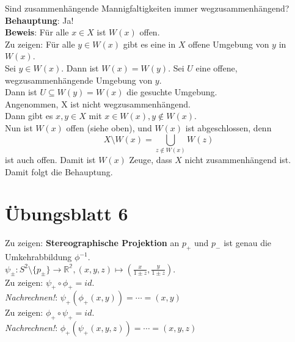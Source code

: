 \begin{problem}[4b]
  Sind zusammenhängende Mannigfaltigkeiten immer wegzusammenhängend? \\
  \textbf{Behauptung}: Ja! \\
  \textbf{Beweis}: Für alle \( x \in X \) ist \( W(x) \) offen. \\
  Zu zeigen: Für alle \( y \in W(x) \) gibt es eine in \( X \) offene Umgebung von \( y \) in \( W(x) \). \\
  Sei \( y \in W(x) \). Dann ist \( W(x) = W(y) \). Sei \( U \) eine offene, wegzusammenhängende Umgebung von \( y \). \\
  Dann ist \( U \subseteq W(y) = W(x) \) die gesuchte Umgebung. \\
  Angenommen, X ist nicht wegzusammenhängend. \\
  Dann gibt es \( x,y \in X \) mit \( x \in W(x), y \notin W(x) \). \\
  Nun ist \( W(x) \) offen (siehe oben), und \( W(x) \) ist abgeschlossen, denn
  \begin{equation*}
    X \setminus W(x) = \bigcup_{z \notin W(x)} W(z)
  \end{equation*}
  ist auch offen. Damit ist \( W(x) \) Zeuge, dass \( X \) nicht zusammenhängend ist. Damit folgt die Behauptung.
\end{problem}



%
\section{Übungsblatt 6}

\begin{problem}[1a]
  Zu zeigen: \textbf{Stereographische Projektion} an \( p_+ \) und \( p_- \) ist genau die Umkehrabbildung \( \phi^{-1} \). \\
  \( \psi_\pm : S^2 \setminus \{ p_\pm \} \to \mathbb{R^2}, (x,y,z) \mapsto (\frac{x}{1\pm z},\frac{y}{1\pm z}) \). \\
  Zu zeigen: \( \psi_+ \circ \phi_+ = id \). \\ \emph{Nachrechnen!}: \( \psi_+ (\phi_+ (x,y)) = \cdots = (x,y) \) \\
  Zu zeigen: \( \phi_+ \circ \psi_+ = id \). \\ \emph{Nachrechnen!}: \( \phi_+ (\psi_+ (x,y,z)) = \cdots = (x,y,z) \) \\
\end{problem}

